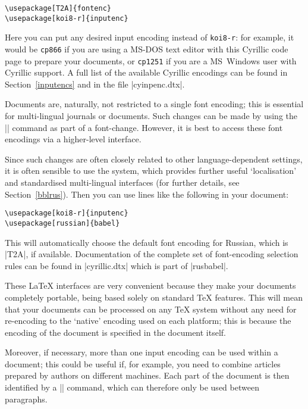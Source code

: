 \documentclass{ltxguide}[1999/02/28]
\begin{document}
\begin{verbatim}
\usepackage[T2A]{fontenc}
\usepackage[koi8-r]{inputenc}
\end{verbatim}

Here you can put any desired input encoding instead of
\mbox{\texttt{koi8-r}}: for example, it would be \texttt{cp866} if you are
using a MS-DOS text editor with this Cyrillic code page to prepare your
documents, or \texttt{cp1251} if you are a MS~Windows user with Cyrillic
support.  A full list of the available Cyrillic encodings can be found in
Section~\ref{inputencs} and in the file |cyinpenc.dtx|.

Documents are, naturally, not restricted to a single font encoding;
this is essential for multi-lingual journals or documents.  Such
changes can be made by using the |\fontencoding| command as part of a
font-change.  However, it is best to access these font encodings via a
higher-level interface.

Since such changes are often closely related to other
language-dependent settings, it is often sensible to use the \babel{}
system, which provides further useful `localisation' and standardised
multi-lingual interfaces (for further details, see
Section~\ref{bblrus}). Then you can use lines like the following in
your document:

\begin{verbatim}
\usepackage[koi8-r]{inputenc}
\usepackage[russian]{babel}
\end{verbatim}

This will automatically choose the default font encoding for Russian,
which is |T2A|, if available.  Documentation of the complete set of
font-encoding selection rules can be found in |cyrillic.dtx| which is
part of |rusbabel|.

These \LaTeX{} interfaces are very convenient because they make your
documents completely portable, being based solely on standard \TeX{}
features.  This will mean that your documents can be processed on any
\TeX{} system without any need for re-encoding to the `native'
encoding used on each platform; this is because the encoding of the
document is specified in the document itself.

Moreover, if necessary, more than one input encoding can be used
within a document; this could be useful if, for example, you need to
combine articles prepared by authors on different machines.  Each part
of the document is then identified by a || command,
which can therefore only be used between paragraphs.
\end{document}
